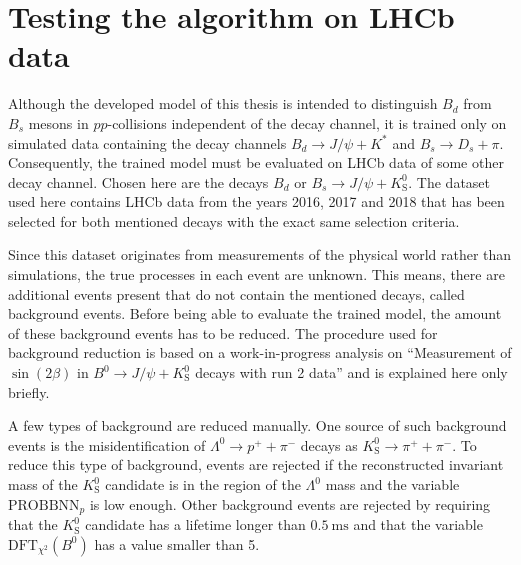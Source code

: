 \section{Testing the algorithm on LHCb data}



Although the developed model of this thesis is intended to distinguish $B_d$ from $B_s$ mesons in $pp$-collisions independent of the decay channel, it is trained only on simulated data containing the decay channels $B_d \rightarrow J/\psi + K^*$ and $B_s \rightarrow D_s + \pi$.
Consequently, the trained model must be evaluated on LHCb data of some other decay channel.
Chosen here are the decays $B_d \text{ or } B_s \rightarrow J/\psi + K^0_\text{S}$.
The dataset used here contains LHCb data from the years 2016, 2017 and 2018 that has been selected for both mentioned decays with the exact same selection criteria.

Since this dataset originates from measurements of the physical world rather than simulations, the true processes in each event are unknown. This means, there are additional events present that do not contain the mentioned decays, called background events.
Before being able to evaluate the trained model, the amount of these background events has to be reduced.
The procedure used for background reduction is based on a work-in-progress analysis on \enquote{Measurement of $\sin(2\beta)$ in $B^0\rightarrow J/\psi + K^0_\text{S}$ decays with run 2 data} and is explained here only briefly.

A few types of background are reduced manually.
One source of such background events is the misidentification of $\Lambda^0 \rightarrow p^+ + \pi^-$ decays as $K^0_\text{S} \rightarrow \pi^+ + \pi^-$.
To reduce this type of background, events are rejected if the reconstructed invariant mass of the $K^0_\text{S}$ candidate is in the region of the $\Lambda^0$ mass and the variable $\text{PROBBNN}_p$ is low enough.
Other background events are rejected by requiring that the $K^0_\text{S}$ candidate has a lifetime longer than $\qty{0.5}{\ms}$ and that the variable $\text{DFT}_{\chi^2}(B^0)$ has a value smaller than 5.

